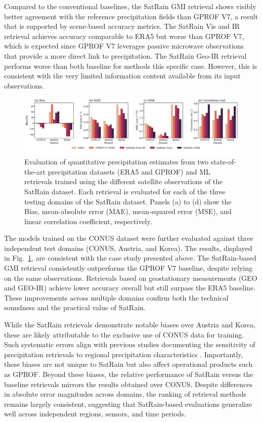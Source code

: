 \documentclass[11pt]{article}
\begin{document}
Compared to the conventional baselines, the SatRain GMI retrieval shows visibly
better agreement with the reference precipitation fields than GPROF V7, a result
that is supported by scene-based accuracy metrics. The SatRain Vis and IR
retrieval achieves accuracy comparable to ERA5 but worse than GPROF V7, which is
expected since GPROF V7 leverages passive microwave observations that provide a
more direct link to precipitation. The SatRain Geo-IR retrieval performs worse
than both baseline for methods this specific case. However, this is consistent
with the very limited information content available from its input observations.


\begin{figure}[htbp] %
	\centering
	\includegraphics[width=1.0\textwidth]{figures/fig10}
	\caption{
		Evaluation of quantitative precipitation estimates from two state-of-the-art
		precipitation datasets (ERA5 and GPROF) and ML retrievals trained using the
		different satellite observations of the SatRain dataset. Each retrieval is
		evaluated for each of the three testing domains of the SatRain dataset. Panels
		(a) to (d) show the Bias, mean-absolute error (MAE), mean-squared error (MSE),
		and linear correlation coefficient, respectively.
	}
	\label{fig:sensor_comparison}
\end{figure}

The models trained on the CONUS dataset were further evaluated against three
independent test domains (CONUS, Austria, and Korea). The results, displayed in
Fig.~\ref{fig:sensor_comparison}, are consistent with the case study presented
above. The SatRain-based GMI retrieval consistently outperforms the GPROF V7
baseline, despite relying on the same observations. Retrievals based on
geostationary measurements (GEO and GEO-IR) achieve lower accuracy overall but
still surpass the ERA5 baseline. These improvements across multiple domains
confirm both the technical soundness and the practical value of SatRain.

While the SatRain retrievals demonstrate notable biases over Austria and Korea,
these are likely attributable to the exclusive use of CONUS data for training.
Such systematic errors align with previous studies documenting the sensitivity
of precipitation retrievals to regional precipitation characteristics
\citep{Sohn2013WarmRain}. Importantly, these biases are not unique to SatRain
but also affect operational products such as GPROF. Beyond these biases, the
relative performance of SatRain versus the baseline retrievals mirrors the
results obtained over CONUS. Despite differences in absolute error magnitudes
across domains, the ranking of retrieval methods remains largely consistent,
suggesting that SatRain-based evaluations generalize well across independent
regions, sensors, and time periods.
\end{document}
